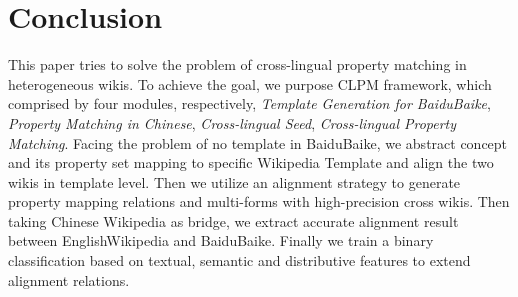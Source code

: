 \documentclass[runningheads,a4paper]{llncs}
\begin{document}
\section{Conclusion}
This paper tries to solve the problem of cross-lingual property matching in heterogeneous wikis. To achieve the goal, we purpose CLPM framework, which comprised by four modules, respectively, \textit{Template Generation for BaiduBaike}, \textit{Property Matching in Chinese}, \textit{Cross-lingual Seed}, \textit{Cross-lingual Property Matching}. Facing the problem of no template in BaiduBaike, we abstract concept and its property set mapping to specific Wikipedia Template and align the two wikis in template level. Then we utilize an alignment strategy to generate property mapping relations and multi-forms with high-precision cross wikis. Then taking Chinese Wikipedia as bridge, we extract accurate alignment result between EnglishWikipedia and BaiduBaike. Finally we train a binary classification based on textual, semantic and distributive features to extend alignment relations.




\end{document}
